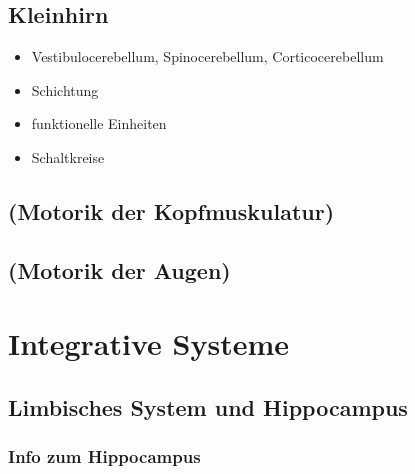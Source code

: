 \documentclass[12pt,a4paper,pdftex]{article}
\begin{document}
\subsection{Kleinhirn}
\begin{itemize}
    \item Vestibulocerebellum, Spinocerebellum, Corticocerebellum 
    \item Schichtung
    \item funktionelle Einheiten
    \item Schaltkreise
\end{itemize}
\subsection{(Motorik der Kopfmuskulatur)}
\subsection{(Motorik der Augen)}

\newpage
\section{Integrative Systeme}
\subsection{Limbisches System und Hippocampus}

\subsubsection*{Info zum Hippocampus}
\end{document}
